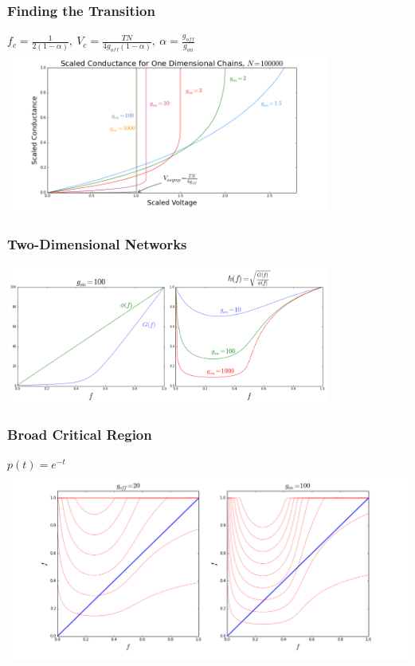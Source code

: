 \documentclass[mathserif]{beamer}
\begin{document}
\begin{frame}
\frametitle{Finding the Transition}
\centering
$f_c = \frac{1}{2(1-\alpha)}, \: V_c = \frac{TN}{4g_{off}(1-\alpha)},
 \: \alpha = \frac{g_{off}}{g_{on}}$
\includegraphics[width=0.8\textwidth]{1D_Cond.png}

\end{frame}

\begin{frame}
\frametitle{Two-Dimensional Networks}
\begin{center}
\includegraphics[width=0.8\textwidth]{MF_upper_limit.png}
\end{center}

\end{frame}
\begin{frame}
\frametitle{Broad Critical Region}
$p(t) = e^{-t}$
\includegraphics[width=\textwidth]{2D_MF_expon.png}

\end{frame}
\end{document}
